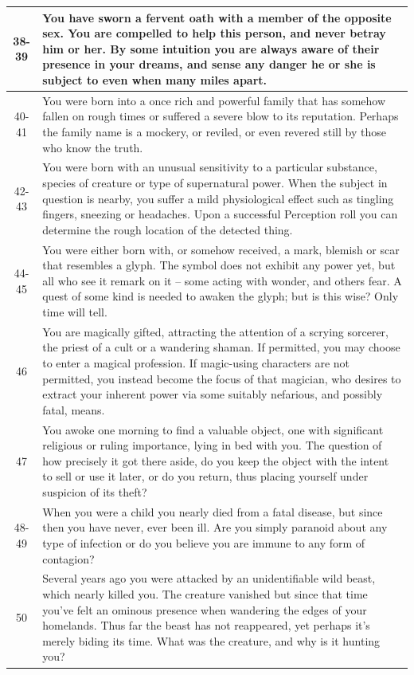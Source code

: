 \documentclass[10pt]{article}
\begin{document}
\begin{longtable}{|c|p{12cm}|}
\hline
38-39 & You have sworn a fervent oath with a member of the opposite sex. You are compelled to help this person, and never betray him or her. By some intuition you are always aware of their presence in your dreams, and sense any danger he or she is subject to even when many miles apart. \\
\hline
40-41 & You were born into a once rich and powerful family that has somehow fallen on rough times or suffered a severe blow to its reputation. Perhaps the family name is a mockery, or reviled, or even revered still by those who know the truth. \\
\hline
42-43 & You were born with an unusual sensitivity to a particular substance, species of creature or type of supernatural power. When the subject in question is nearby, you suffer a mild physiological effect such as tingling fingers, sneezing or headaches. Upon a successful Perception roll you can determine the rough location of the detected thing. \\
\hline
44-45 & You were either born with, or somehow received, a mark, blemish or scar that resembles a glyph. The symbol does not exhibit any power yet, but all who see it remark on it – some acting with wonder, and others fear. A quest of some kind is needed to awaken the glyph; but is this wise? Only time will tell. \\
\hline
46 & You are magically gifted, attracting the attention of a scrying sorcerer, the priest of a cult or a wandering shaman. If permitted, you may choose to enter a magical profession. If magic-using characters are not permitted, you instead become the focus of that magician, who desires to extract your inherent power via some suitably nefarious, and possibly fatal, means. \\
\hline
47 & You awoke one morning to find a valuable object, one with significant religious or ruling importance, lying in bed with you. The question of how precisely it got there aside, do you keep the object with the intent to sell or use it later, or do you return, thus placing yourself under suspicion of its theft? \\
\hline
48-49 & When you were a child you nearly died from a fatal disease, but since then you have never, ever been ill. Are you simply paranoid about any type of infection or do you believe you are immune to any form of contagion? \\
\hline
50 & Several years ago you were attacked by an unidentifiable wild beast, which nearly killed you. The creature vanished but since that time you've felt an ominous presence when wandering the edges of your homelands. Thus far the beast has not reappeared, yet perhaps it's merely biding its time. What was the creature, and why is it hunting you? \\

\end{longtable}
\end{document}
